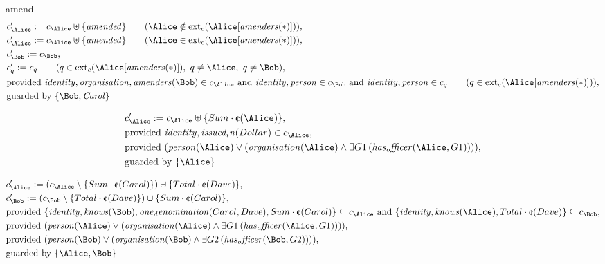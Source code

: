 amend
\fi
\begin{align*}
&
c'_
{
\Alice
}
 := 
c_
{
\Alice
}
 \uplus 
\{
\mathit{
amended
}
\}
 \qquad (
\Alice
 \notin 
\mathrm{ext}_c(
\Alice
[
\mathit{
amenders
}
(
\ast
)
]
)
)
,\\
&
c'_
{
\Alice
}
 := 
c_
{
\Alice
}
 \uplus 
\{
\mathit{
amended
}
\}
 \qquad (
\Alice
 \in 
\mathrm{ext}_c(
\Alice
[
\mathit{
amenders
}
(
\ast
)
]
)
)
,\\
&
c'_
{
\Bob
}
 := 
c_
{
\Bob
}
,\\
&
c'_
q
 := 
c_
q
 \qquad (
q
 \in 
\mathrm{ext}_c(
\Alice
[
\mathit{
amenders
}
(
\ast
)
]
)
,\ 
q \neq 
\Alice
,\ 
q \neq 
\Bob
)
,\\
&
\text{provided } 
\mathit{
identity
}
,
\mathit{
organisation
}
,
\mathit{
amenders
}
(
\Bob
)
 \in c_
{
\Alice
}
 \text{ and } 
\mathit{
identity
}
,
\mathit{
person
}
 \in c_
{
\Bob
}
 \text{ and } 
\mathit{
identity
}
,
\mathit{
person
}
 \in c_
q
 \qquad (
q \in 
\mathrm{ext}_c(
\Alice
[
\mathit{
amenders
}
(
\ast
)
]
)
)
,\\
&
\text{guarded by } \{
\Bob
,
\mathit{Carol}
\}
\end{align*}

\begin{align*}
&
c'_
{
\Alice
}
 := 
c_
{
\Alice
}
 \uplus 
\{
Sum
\cdot
\text{\textcent}
(
\Alice
)
\}
,\\
&
\text{provided } 
\mathit{
identity
}
,
\mathit{
issued_in
}
(
Dollar
)
 \in c_
{
\Alice
}
,\\
&
\text{provided } 
(
\mathit{
person
}
(
\Alice
)
\lor
(
\mathit{
organisation
}
(
\Alice
)
\land
\exists 
G1
\,(
\mathit{
has_officer
}
(
\Alice
,
G1
)
)
)
)
,\\
&
\text{guarded by } \{
\Alice
\}
\end{align*}

\begin{align*}
&
c'_
{
\Alice
}
 := 
(c_
{
\Alice
}
 \setminus 
\{
Sum
\cdot
\text{\textcent}
(
Carol
)
\}
) \uplus 
\{
Total
\cdot
\text{\textcent}
(
Dave
)
\}
,\\
&
c'_
{
\Bob
}
 := 
(c_
{
\Bob
}
 \setminus 
\{
Total
\cdot
\text{\textcent}
(
Dave
)
\}
) \uplus 
\{
Sum
\cdot
\text{\textcent}
(
Carol
)
\}
,\\
&
\text{provided } 
\{
\mathit{
identity
}
,
\mathit{
knows
}
(
\Bob
)
,
\mathit{
one_denomination
}
(
Carol
,
Dave
)
,
Sum
\cdot
\text{\textcent}
(
Carol
)
\}
 \subseteq c_
{
\Alice
}
 \text{ and } 
\{
\mathit{
identity
}
,
\mathit{
knows
}
(
\Alice
)
,
Total
\cdot
\text{\textcent}
(
Dave
)
\}
 \subseteq c_
{
\Bob
}
,\\
&
\text{provided } 
(
\mathit{
person
}
(
\Alice
)
\lor
(
\mathit{
organisation
}
(
\Alice
)
\land
\exists 
G1
\,(
\mathit{
has_officer
}
(
\Alice
,
G1
)
)
)
)
,\\
&
\text{provided } 
(
\mathit{
person
}
(
\Bob
)
\lor
(
\mathit{
organisation
}
(
\Bob
)
\land
\exists 
G2
\,(
\mathit{
has_officer
}
(
\Bob
,
G2
)
)
)
)
,\\
&
\text{guarded by } \{
\Alice
,
\Bob
\}
\end{align*}
